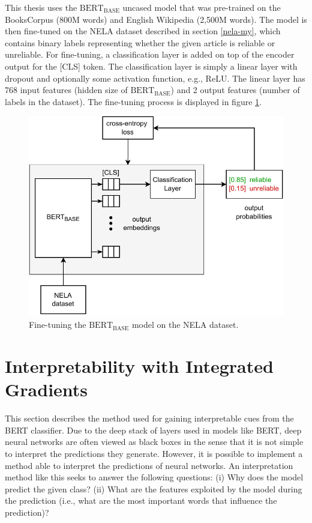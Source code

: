 This thesis uses the $\operatorname{{BERT_{BASE}}}$ uncased model that was pre-trained on the BooksCorpus (800M words) \cite{book_corpus} and English Wikipedia (2,500M words). The model is then fine-tuned on the NELA dataset described in section \ref{nela-my}, which contains binary labels representing whether the given article is reliable or unreliable. For fine-tuning, a classification layer is added on top of the encoder output for the [CLS] token. The classification layer is simply a linear layer with dropout and optionally some activation function, e.g., ReLU. The linear layer has 768 input features (hidden size of $\operatorname{{BERT_{BASE}}}$) and 2 output features (number of labels in the dataset). The fine-tuning process is displayed in figure \ref{fig:bert2}.

\begin{figure}[H]
    \centering
    \includegraphics[scale=0.9]{obrazky-figures/bert2.pdf}
    \caption{Fine-tuning the $\operatorname{BERT_{BASE}}$ model on the NELA dataset.}
    \label{fig:bert2}
\end{figure}



\section{Interpretability with Integrated Gradients}
\label{sec:integ_grads}
This section describes the method used for gaining interpretable cues from the BERT classifier. Due to the deep stack of layers used in models like BERT, deep neural networks are often viewed as black boxes in the sense that it is not simple to interpret the predictions they generate. However, it is possible to implement a method able to interpret the predictions of neural networks. An interpretation method like this seeks to answer the following questions: (i) Why does the model predict the given class? (ii) What are the features exploited by the model during the prediction (i.e., what are the most important words that influence the prediction)?

